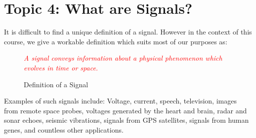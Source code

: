 \documentclass[../notes-main.tex]{subfiles}
\begin{document}
\section{Topic 4: What are Signals?}
It is difficult to find a unique definition of a signal. However in the context of this course, we give a workable definition which suits most of our purposes as:
\begin{figure}[H]
    \centering
    \begin{mdframed}
        \begin{center}
            \textcolor{red}{%
                \emph{A signal conveys information about a physical phenomenon which evolves in time or space.}}
        \end{center}
    \end{mdframed}\label{fig:signal-def-1}
    \vspace{-1em}\caption{Definition of a Signal}
\end{figure}
\vspace{-1em}
\noindent Examples of such signals include: Voltage, current, speech, television, images from remote space probes, voltages generated by the heart and brain, radar and sonar echoes, seismic vibrations, signals from GPS satellites, signals from human genes, and countless other applications.
\end{document}
